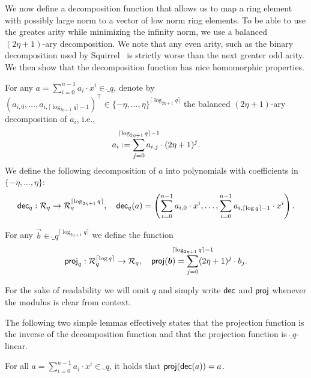 We now define a decomposition function that allows us to map a ring element with possibly large norm to a vector of low norm ring elements.
To be able to use the greates arity while minimizing the infinity norm, we use a balanced $(2\eta+1)$-ary decomposition.
We note that any even arity, such as the binary decomposition used by Squirrel~\cite{CCS:FleSimZha22} is strictly worse than the next greater odd arity.
We then show that the decomposition function has nice homomorphic properties.
\begin{definition}
    For any $a = \sum_{i=0}^{n-1} a_i\cdot x^i  \in \ring_q$,
    denote by $(a_{i,0},\dots,a_{i,\lceil \log_{2\eta+1} q \rceil-1})^\intercal\in \{-\eta,\dots,\eta\}^{\lceil\log_{2\eta+1} q\rceil}$ the balanced $(2\eta+1)$-ary decomposition of $a_i$, i.e.,
    \[a_{i} := \smashoperator{\sum_{j=0}^{\lceil\log_{2\eta+1} q\rceil - 1}} a_{i,j}\cdot (2\eta+1)^j.\]
    We define the following decomposition of $a$ into polynomials with coefficients in $\{-\eta,\dots,\eta\}$:
    \begin{equation*}
        \mathsf{dec}_q: \mathcal{R}_q \to \mathcal{R}_q^{\lceil\log_{2\eta+1} q\rceil},\quad
        \mathsf{dec}_q(a) = \left(\sum_{i=0}^{n-1} a_{i,0}\cdot x^i, \dots, \sum_{i=0}^{n-1} a_{i,\lceil\log q\rceil -1}\cdot x^i \right).
    \end{equation*}
\end{definition}

\begin{definition}\label{def:proj}
  For any $\vec{b} \in \ring_q^{\lceil\log_{2\eta+1} q\rceil}$ we define the function 
  \[
    \proj_q : \ring_q^{\lceil\log q\rceil} \to \ring_q,\quad \proj(\vec{b}) = \smashoperator{\sum_{j=0}^{\lceil\log_{2\eta+1} q\rceil -1}} (2\eta+1)^j\cdot b_j.
  \]
\end{definition}

For the sake of readability we will omit $q$ and simply write $\mathsf{dec}$ and $\mathsf{proj}$ whenever the modulus is clear from context.

The following two simple lemmas effectively states that the projection function is the inverse of the decomposition function and that the projection function is $\ring_q$-linear.
\begin{lemma}\label{lem:projinvofbin}
  For all $a = \sum_{i=0}^{n-1} a_i\cdot x^i \in\ring_q$, it holds that $\mathsf{proj}(\mathsf{dec}(a))=a$.
\end{lemma}

